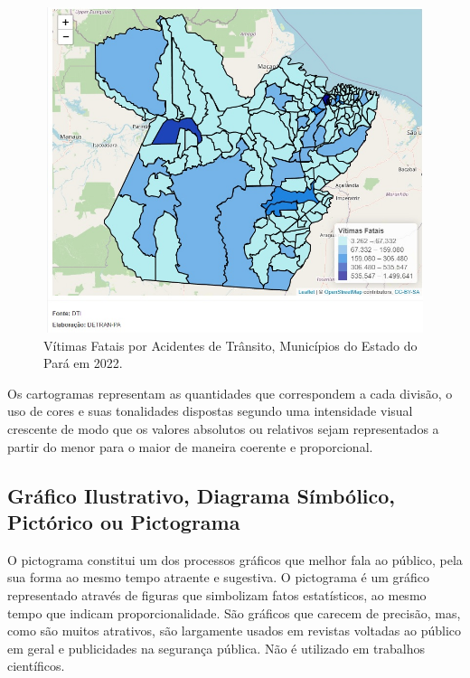 \begin{figure}[H]
    \centering
\includegraphics[scale=0.25,height=270pt,width=12cm]{figures/Map1.jpeg}
    \caption{Vítimas Fatais por Acidentes de Trânsito, Municípios do Estado do Pará em 2022.}
    \label{fig:my_label25}
\end{figure}


Os cartogramas representam as quantidades que correspondem a cada divisão, o uso de cores e suas tonalidades dispostas segundo uma intensidade visual crescente de modo que os valores absolutos ou relativos sejam representados a partir do menor para o maior de maneira coerente e proporcional. 






\newpage
\subsection{Gráfico Ilustrativo, Diagrama Símbólico, Pictórico ou Pictograma}

O pictograma constitui um dos processos gráficos que melhor fala
ao público, pela sua forma ao mesmo tempo atraente e sugestiva. O
pictograma é um gráfico representado através de figuras que
simbolizam fatos estatísticos, ao mesmo tempo que indicam
proporcionalidade. São gráficos que carecem de precisão, mas, como
são muitos atrativos, são largamente usados em revistas voltadas
ao público em geral e publicidades na segurança pública. Não é
utilizado em trabalhos científicos.\vskip0.3cm

